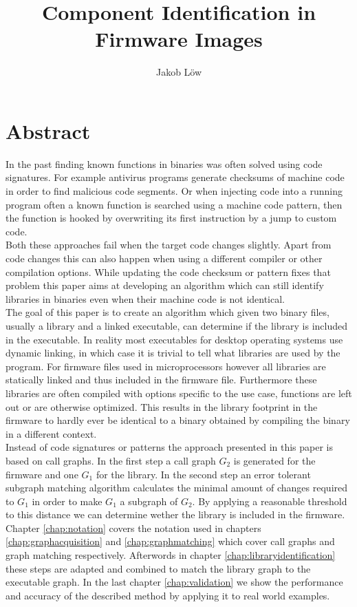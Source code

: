 \documentclass[
    12pt,                               %
    DIV=14,                     %
    parskip=half+,              %
    bigheadings,                %
    cleardoubleempty,   %
    halfparskip,                %
    ]{scrreprt} %
\title{Component Identification in Firmware Images}
\author{Jakob Löw}
\date{}
\begin{document}
\maketitle
\newpage

\tableofcontents
\newpage

\chapter{Abstract}
In the past finding known functions in binaries was often solved using code signatures. For example antivirus programs generate checksums of machine code in order to find malicious code segments. Or when injecting code into a running program often a known function is searched using a machine code pattern, then the function is hooked by overwriting its first instruction by a jump to custom code. \\
Both these approaches fail when the target code changes slightly. Apart from code changes this can also happen when using a different compiler or other compilation options. While updating the code checksum or pattern fixes that problem this paper aims at developing an algorithm which can still identify libraries in binaries even when their machine code is not identical. \\
The goal of this paper is to create an algorithm which given two binary files, usually a library and a linked executable, can determine if the library is included in the executable. In reality most executables for desktop operating systems use dynamic linking, in which case it is trivial to tell what libraries are used by the program. For firmware files used in microprocessors however all libraries are statically linked and thus included in the firmware file. Furthermore these libraries are often compiled with options specific to the use case, functions are left out or are otherwise optimized. This results in the library footprint in the firmware to hardly ever be identical to a binary obtained by compiling the binary in a different context. \\
Instead of code signatures or patterns the approach presented in this paper is based on call graphs. In the first step a call graph $G_2$ is generated for the firmware and one $G_1$ for the library. In the second step an error tolerant subgraph matching algorithm calculates the minimal amount of changes required to $G_1$ in order to make $G_1$ a subgraph of $G_2$. By applying a reasonable threshold to this distance we can determine wether the library is included in the firmware. \\
Chapter \ref{chap:notation} covers the notation used in chapters \ref{chap:graphacquisition} and \ref{chap:graphmatching} which cover call graphs and graph matching respectively. Afterwords in chapter \ref{chap:libraryidentification} these steps are adapted and combined to match the library graph to the executable graph. In the last chapter \ref{chap:validation} we show the performance and accuracy of the described method by applying it to real world examples.
\end{document}
